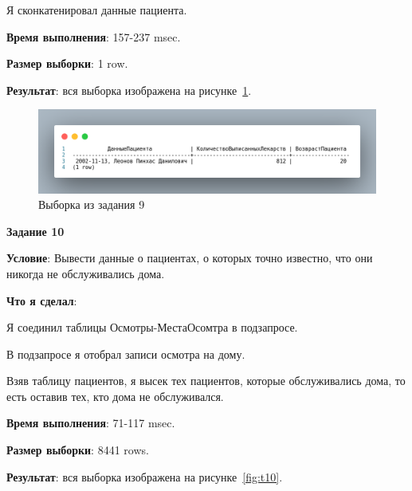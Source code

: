 Я сконкатенировал данные пациента.



\textbf{Время выполнения}: 157-237 msec.

\textbf{Размер выборки}: 1 row.

\textbf{Результат}: вся выборка изображена на рисунке~\ref{fig:t9}.

\begin{figure}[!h]
  \centering

  \includegraphics[width=16cm]
  {../sql/task9/9-out.png}

  \caption{Выборка из задания 9}

  \label{fig:t9}
\end{figure}

\newpage


\begin{center}
  \textbf{Задание 10}
\end{center}
  
\textbf{Условие}:
Вывести данные о пациентах, о которых точно известно, что они никогда не обслуживались дома.

\textbf{Что я сделал}:

Я соединил таблицы Осмотры-МестаОсомтра в подзапросе.

В подзапросе я отобрал записи осмотра на дому.

Взяв таблицу пациентов, я высек тех пациентов, которые обслуживались дома, то есть оставив тех, кто дома не обслуживался. 



\textbf{Время выполнения}: 71-117 msec.

\textbf{Размер выборки}: 8441 rows.

\textbf{Результат}: вся выборка изображена на рисунке~\ref{fig:t10}.

